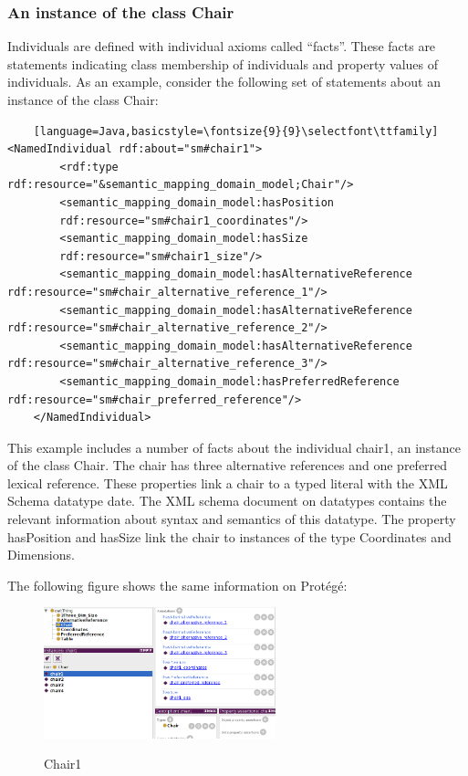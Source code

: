 \subsubsection*{An instance of the class Chair}
Individuals are defined with individual axioms called ``facts''. These facts are statements indicating class membership of individuals and property values of individuals. As an example, consider the following set of statements about an instance of the class Chair:

\begin{lstlisting}    [language=Java,basicstyle=\fontsize{9}{9}\selectfont\ttfamily]
<NamedIndividual rdf:about="sm#chair1">
        <rdf:type rdf:resource="&semantic_mapping_domain_model;Chair"/>
        <semantic_mapping_domain_model:hasPosition 
        rdf:resource="sm#chair1_coordinates"/>
        <semantic_mapping_domain_model:hasSize 
        rdf:resource="sm#chair1_size"/>
        <semantic_mapping_domain_model:hasAlternativeReference rdf:resource="sm#chair_alternative_reference_1"/>
        <semantic_mapping_domain_model:hasAlternativeReference   rdf:resource="sm#chair_alternative_reference_2"/>
        <semantic_mapping_domain_model:hasAlternativeReference  rdf:resource="sm#chair_alternative_reference_3"/>
        <semantic_mapping_domain_model:hasPreferredReference rdf:resource="sm#chair_preferred_reference"/>
    </NamedIndividual>
\end{lstlisting}

This example includes a number of facts about the individual chair1, an instance of the class Chair. The chair has three alternative references and one preferred lexical reference. These properties link a chair to a typed literal with the XML Schema datatype date. The XML schema document on datatypes contains the relevant information about syntax and semantics of this datatype. The property hasPosition and hasSize link the chair to instances of the type Coordinates and Dimensions.

The following figure shows the same information on Prot\'eg\'e:

\begin{figure}[H]
\centering
\includegraphics[width=0.6\textwidth]{imgs/chair1.png}
\label{fig:datatypes}
\caption{Chair1}
\end{figure}

